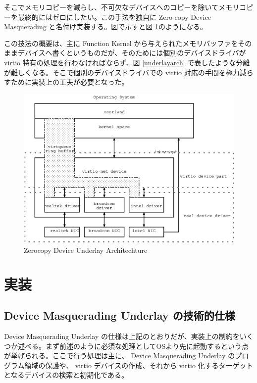 \documentclass[a4paper,11pt,report]{ltjsbook}
\begin{document}
そこでメモリコピーを減らし、不可欠なデバイスへのコピーを除いてメモリコピーを最終的にはゼロにしたい。この手法を独自に Zero-copy Device Masquerading と名付け実装する。図で示すと図 \ref{underlayzerocpy}のようになる。

この技法の概要は、主に Function Kernel から与えられたメモリバッファをそのままデバイスへ書くというものだが、そのためには個別のデバイスドライバが virtio 特有の処理を行わなければならず、図 \ref{underlayarch} で表したような分離が難しくなる。そこで個別のデバイスドライバでの virtio 対応の手間を極力減らすために実装上の工夫が必要となった。

\begin{figure}[htbp]
  \begin{center}
    \includegraphics[width=.7\textwidth]{./underlayzerocpy.eps}
    \caption{Zerocopy Device Underlay Architechture}
    \label{underlayzerocpy}
  \end{center}
\end{figure}



\chapter{実装}

\section{Device Masquerading Underlay の技術的仕様}

Device Masquerading Underlay の仕様は上記のとおりだが、実装上の制約をいくつか述べる。まず前述のように必須な処理としてOSより先に起動するという点が挙げられる。ここで行う処理は主に、 Device Masquerading Underlay のプログラム領域の保護や、 virtio デバイスの作成、それから virtio 化するターゲットとなるデバイスの検索と初期化である。
\end{document}
